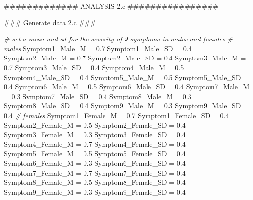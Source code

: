 \documentclass[]{article}
\newenvironment{Shaded}{\begin{snugshade}}{\end{snugshade}}
\newcommand{\FloatTok}[1]{\textcolor[rgb]{0.00,0.00,0.81}{#1}}
\newcommand{\StringTok}[1]{\textcolor[rgb]{0.31,0.60,0.02}{#1}}
\newcommand{\CommentTok}[1]{\textcolor[rgb]{0.56,0.35,0.01}{\textit{#1}}}
\newcommand{\AlertTok}[1]{\textcolor[rgb]{0.94,0.16,0.16}{#1}}
\newcommand{\NormalTok}[1]{#1}
\begin{document}
\begin{Shaded}
\begin{Highlighting}[]
\NormalTok{############# ANALYSIS 2.c ################}

\NormalTok{### Generate data 2.c }\AlertTok{###}

\CommentTok{# set a mean and sd for the severity of 9 symptoms in males and females}
\CommentTok{# males}
\NormalTok{Symptom1_Male_M =}\StringTok{ }\FloatTok{0.7}
\NormalTok{Symptom1_Male_SD =}\StringTok{ }\FloatTok{0.4}
\NormalTok{Symptom2_Male_M =}\StringTok{ }\FloatTok{0.7}
\NormalTok{Symptom2_Male_SD =}\StringTok{ }\FloatTok{0.4}
\NormalTok{Symptom3_Male_M =}\StringTok{ }\FloatTok{0.7}
\NormalTok{Symptom3_Male_SD =}\StringTok{ }\FloatTok{0.4}
\NormalTok{Symptom4_Male_M =}\StringTok{ }\FloatTok{0.5}
\NormalTok{Symptom4_Male_SD =}\StringTok{ }\FloatTok{0.4}
\NormalTok{Symptom5_Male_M =}\StringTok{ }\FloatTok{0.5}
\NormalTok{Symptom5_Male_SD =}\StringTok{ }\FloatTok{0.4}
\NormalTok{Symptom6_Male_M =}\StringTok{ }\FloatTok{0.5}
\NormalTok{Symptom6_Male_SD =}\StringTok{ }\FloatTok{0.4}
\NormalTok{Symptom7_Male_M =}\StringTok{ }\FloatTok{0.3}
\NormalTok{Symptom7_Male_SD =}\StringTok{ }\FloatTok{0.4}
\NormalTok{Symptom8_Male_M =}\StringTok{ }\FloatTok{0.3}
\NormalTok{Symptom8_Male_SD =}\StringTok{ }\FloatTok{0.4}
\NormalTok{Symptom9_Male_M =}\StringTok{ }\FloatTok{0.3}
\NormalTok{Symptom9_Male_SD =}\StringTok{ }\FloatTok{0.4}
\CommentTok{# females}
\NormalTok{Symptom1_Female_M =}\StringTok{ }\FloatTok{0.7}
\NormalTok{Symptom1_Female_SD =}\StringTok{ }\FloatTok{0.4}
\NormalTok{Symptom2_Female_M =}\StringTok{ }\FloatTok{0.5}
\NormalTok{Symptom2_Female_SD =}\StringTok{ }\FloatTok{0.4}
\NormalTok{Symptom3_Female_M =}\StringTok{ }\FloatTok{0.3}
\NormalTok{Symptom3_Female_SD =}\StringTok{ }\FloatTok{0.4}
\NormalTok{Symptom4_Female_M =}\StringTok{ }\FloatTok{0.7}
\NormalTok{Symptom4_Female_SD =}\StringTok{ }\FloatTok{0.4}
\NormalTok{Symptom5_Female_M =}\StringTok{ }\FloatTok{0.5}
\NormalTok{Symptom5_Female_SD =}\StringTok{ }\FloatTok{0.4}
\NormalTok{Symptom6_Female_M =}\StringTok{ }\FloatTok{0.3}
\NormalTok{Symptom6_Female_SD =}\StringTok{ }\FloatTok{0.4}
\NormalTok{Symptom7_Female_M =}\StringTok{ }\FloatTok{0.7}
\NormalTok{Symptom7_Female_SD =}\StringTok{ }\FloatTok{0.4}
\NormalTok{Symptom8_Female_M =}\StringTok{ }\FloatTok{0.5}
\NormalTok{Symptom8_Female_SD =}\StringTok{ }\FloatTok{0.4}
\NormalTok{Symptom9_Female_M =}\StringTok{ }\FloatTok{0.3}
\NormalTok{Symptom9_Female_SD =}\StringTok{ }\FloatTok{0.4}


\end{Highlighting}
\end{Shaded}
\end{document}
